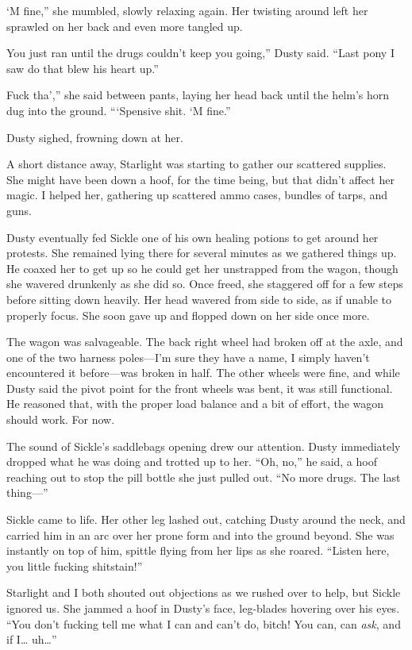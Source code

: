 \leavevmode{}‘M fine,” she mumbled, slowly relaxing again. Her twisting around left her sprawled on her back and even more tangled up.

\leavevmode{}You just ran until the drugs couldn’t keep you going,” Dusty said. “Last pony I saw do that blew his heart up.”

\leavevmode{}Fuck tha’,” she said between pants, laying her head back until the helm’s horn dug into the ground. “‘Spensive shit. ‘M fine.”

Dusty sighed, frowning down at her.

A short distance away, Starlight was starting to gather our scattered supplies. She might have been down a hoof, for the time being, but that didn’t affect her magic. I helped her, gathering up scattered ammo cases, bundles of tarps, and guns.

Dusty eventually fed Sickle one of his own healing potions to get around her protests. She remained lying there for several minutes as we gathered things up. He coaxed her to get up so he could get her unstrapped from the wagon, though she wavered drunkenly as she did so. Once freed, she staggered off for a few steps before sitting down heavily. Her head wavered from side to side, as if unable to properly focus. She soon gave up and flopped down on her side once more.

The wagon was salvageable. The back right wheel had broken off at the axle, and one of the two harness poles—I’m sure they have a name, I simply haven’t encountered it before—was broken in half. The other wheels were fine, and while Dusty said the pivot point for the front wheels was bent, it was still functional. He reasoned that, with the proper load balance and a bit of effort, the wagon should work. For now.

The sound of Sickle’s saddlebags opening drew our attention. Dusty immediately dropped what he was doing and trotted up to her. “Oh, no,” he said, a hoof reaching out to stop the pill bottle she just pulled out. “No more drugs. The last thing—”

Sickle came to life. Her other leg lashed out, catching Dusty around the neck, and carried him in an arc over her prone form and into the ground beyond. She was instantly on top of him, spittle flying from her lips as she roared. “Listen here, you little fucking shitstain!”

Starlight and I both shouted out objections as we rushed over to help, but Sickle ignored us. She jammed a hoof in Dusty’s face, leg-blades hovering over his eyes. “You don’t fucking tell me what I can and can’t do, bitch! You can, can \textit{ask}, and if I… uh…”

